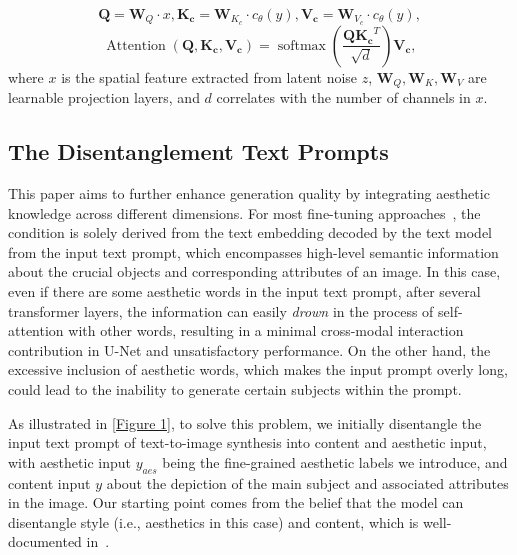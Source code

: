 \begin{equation}
\mathbf{Q}=\mathbf{W}_{Q} \cdot x, \mathbf{K_c}=\mathbf{W}_{K_c} \cdot c_{\theta}(y), \mathbf{V_c}=\mathbf{W}_{V_c} \cdot c_{\theta}(y),\label{eq2}
\end{equation}
\begin{equation}
\operatorname{Attention}\left(\mathbf{Q}, \mathbf{K_c}, \mathbf{V_c}\right)=\operatorname{softmax}\left(\frac{\mathbf{Q} \mathbf{K_c}^T}{\sqrt{d}}\right)\mathbf{V_c},\label{eq3}
\end{equation}
where $x$ is the spatial feature extracted from latent noise $z$, $\mathbf{W}_{Q}, \mathbf{W}_{K}, \mathbf{W}_{V}$ are learnable projection layers, and $d$ correlates with the number of channels in $x$.

\subsection{The Disentanglement Text Prompts}\label{sec3.2}
This paper aims to further enhance generation quality by integrating aesthetic knowledge across different dimensions. For most fine-tuning approaches~\cite{ruiz2023dreambooth,gal2022image}, the condition is solely derived from the text embedding decoded by the text model from the input text prompt, which encompasses high-level semantic information about the crucial objects and corresponding attributes of an image. In this case, even if there are some aesthetic words in the input text prompt, after several transformer layers, the information can easily \textit{drown} in the process of self-attention with other words, resulting in a minimal cross-modal interaction contribution in U-Net and unsatisfactory performance. On the other hand, the excessive inclusion of aesthetic words, which makes the input prompt overly long, could lead to the inability to generate certain subjects within the prompt.

As illustrated in \cref{Figure 1}, to solve this problem, we initially disentangle the input text prompt of text-to-image synthesis into content and aesthetic input, with aesthetic input $y_{aes}$ being the fine-grained aesthetic labels we introduce, and content input $y$ about the depiction of the main subject and associated attributes in the image. Our starting point comes from the belief that the model can disentangle style (i.e., aesthetics in this case) and content, which is well-documented in~\cite{wu2023uncovering}. 

